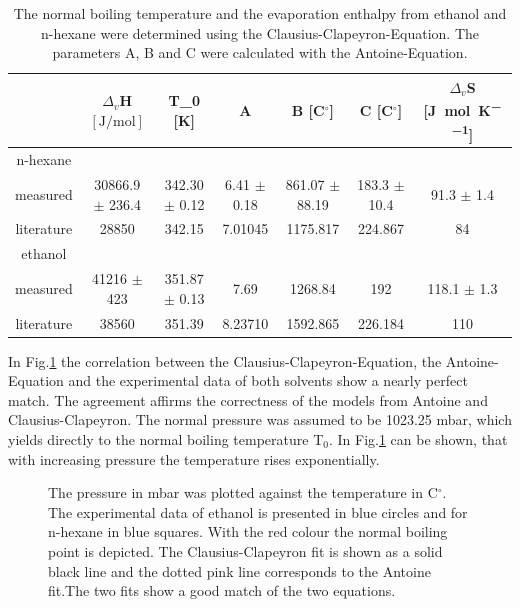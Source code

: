 \documentclass[a4paper,abstracton]{article}	                       %
\renewcommand{\cite}{\supercite}						%
\begin{document}
\begin{table}[H]
\centering
\begin{tabular}{c|c|c|c|c|c|c}
    & $\Delta_{\textit{v}}$H $[\si{\joule\per\mol}]$ & T_{0} [K] & A & B [C$^{\circ}$] & C [C$^{\circ}$] & $\Delta_{\textit{v}}$S [\si{\joule\per\mol\per\kelvin}]\\
    \hline
    n-hexane \\
    \hline
    measured & 30866.9 $\pm$ 236.4 & 342.30 $\pm$ 0.12 & 6.41 $\pm$ 0.18 & 861.07 $\pm$ 88.19 & 183.3 $\pm$ 10.4 & 91.3 $\pm$ 1.4\\
    literature & 28850\cite{meister} & 342.15\cite{nhexane}& 7.01045\cite{meister} & 1175.817\cite{meister} & 224.867\cite{meister} & 84\cite{meister}\\
    \hline
    ethanol \\
    \hline
    measured & 41216 $\pm$ 423 & 351.87 $\pm$ 0.13 & 7.69 & 1268.84 & 192 & 118.1 $\pm$ 1.3\\
    literature & 38560\cite{meister} & 351.39\cite{meister} & 8.23710\cite{meister} & 1592.865\cite{meister} & 226.184\cite{meister}& 110\cite{meister}\\
    
\end{tabular}
\caption{\label{tab:Teil2}The normal boiling temperature and the evaporation enthalpy from ethanol and n-hexane were determined using the Clausius-Clapeyron-Equation. The parameters A, B and C were calculated with the Antoine-Equation.}
\end{table}

In Fig.\ref{fig:DDR2} the correlation between the Clausius-Clapeyron-Equation, the Antoine-Equation and the experimental data of both solvents show a nearly perfect match. The agreement affirms the correctness of the models from Antoine and Clausius-Clapeyron. The normal pressure was assumed to be 1023.25 mbar, which yields directly to the normal boiling temperature T$_{0}$. In Fig.\ref{fig:DDR2} can be shown, that with increasing pressure the temperature rises exponentially. 

\begin{figure}[H]
    \centering
    
    \caption{\label{fig:DDR2} The pressure in mbar was plotted against the temperature in C$^{\circ}$. The experimental data of ethanol is presented in blue circles and for n-hexane in blue squares. With the red colour the normal boiling point is depicted. The Clausius-Clapeyron fit is shown as a solid black line and the dotted pink line corresponds to the Antoine fit.The two fits show a good match of the two equations.} 
\end{figure}
\end{document}
